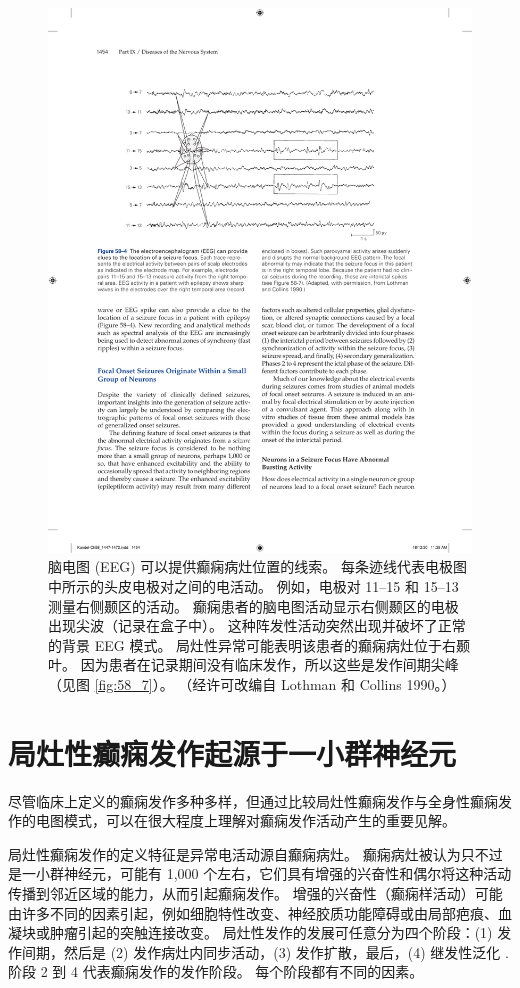 \begin{figure}[htbp]
	\centering
	\includegraphics[width=0.8\linewidth]{chap58/fig_58_4}
	\caption{脑电图 (EEG) 可以提供癫痫病灶位置的线索。 每条迹线代表电极图中所示的头皮电极对之间的电活动。 例如，电极对 11–15 和 15–13 测量右侧颞区的活动。 癫痫患者的脑电图活动显示右侧颞区的电极出现尖波（记录在盒子中）。 这种阵发性活动突然出现并破坏了正常的背景 EEG 模式。 局灶性异常可能表明该患者的癫痫病灶位于右颞叶。 因为患者在记录期间没有临床发作，所以这些是发作间期尖峰（见图 \ref{fig:58_7}）。 （经许可改编自 Lothman 和 Collins 1990。）}
	\label{fig:58_4}
\end{figure}



\section{局灶性癫痫发作起源于一小群神经元}

尽管临床上定义的癫痫发作多种多样，但通过比较局灶性癫痫发作与全身性癫痫发作的电图模式，可以在很大程度上理解对癫痫发作活动产生的重要见解。


局灶性癫痫发作的定义特征是异常电活动源自癫痫病灶。
癫痫病灶被认为只不过是一小群神经元，可能有 1,000 个左右，它们具有增强的兴奋性和偶尔将这种活动传播到邻近区域的能力，从而引起癫痫发作。
增强的兴奋性（癫痫样活动）可能由许多不同的因素引起，例如细胞特性改变、神经胶质功能障碍或由局部疤痕、血凝块或肿瘤引起的突触连接改变。
局灶性发作的发展可任意分为四个阶段：(1) 发作间期，然后是 (2) 发作病灶内同步活动，(3) 发作扩散，最后，(4) 继发性泛化 . 阶段 2 到 4 代表癫痫发作的发作阶段。
每个阶段都有不同的因素。


